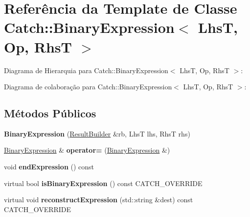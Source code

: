 \hypertarget{classCatch_1_1BinaryExpression}{}\section{Referência da Template de Classe Catch\+:\+:Binary\+Expression$<$ LhsT, Op, RhsT $>$}
\label{classCatch_1_1BinaryExpression}


Diagrama de Hierarquia para Catch\+:\+:Binary\+Expression$<$ LhsT, Op, RhsT $>$\+:


Diagrama de colaboração para Catch\+:\+:Binary\+Expression$<$ LhsT, Op, RhsT $>$\+:
\subsection*{Métodos Públicos}
\begin{DoxyCompactItemize}
\item 
{\bfseries Binary\+Expression} (\hyperlink{classCatch_1_1ResultBuilder}{Result\+Builder} \&rb, LhsT lhs, RhsT rhs)\hypertarget{classCatch_1_1BinaryExpression_a0d81384761aba5f7a6d5f4fc7e7944f3}{}\label{classCatch_1_1BinaryExpression_a0d81384761aba5f7a6d5f4fc7e7944f3}

\item 
\hyperlink{classCatch_1_1BinaryExpression}{Binary\+Expression} \& {\bfseries operator=} (\hyperlink{classCatch_1_1BinaryExpression}{Binary\+Expression} \&)\hypertarget{classCatch_1_1BinaryExpression_a2147a858eb5866e5643d0ef321064aa1}{}\label{classCatch_1_1BinaryExpression_a2147a858eb5866e5643d0ef321064aa1}

\item 
void {\bfseries end\+Expression} () const \hypertarget{classCatch_1_1BinaryExpression_a480b1d75bbac51d1936aec7dad8c1cb1}{}\label{classCatch_1_1BinaryExpression_a480b1d75bbac51d1936aec7dad8c1cb1}

\item 
virtual bool {\bfseries is\+Binary\+Expression} () const C\+A\+T\+C\+H\+\_\+\+O\+V\+E\+R\+R\+I\+DE\hypertarget{classCatch_1_1BinaryExpression_a4c617c0b6a73a9cafbbf900909c7c258}{}\label{classCatch_1_1BinaryExpression_a4c617c0b6a73a9cafbbf900909c7c258}

\item 
virtual void {\bfseries reconstruct\+Expression} (std\+::string \&dest) const C\+A\+T\+C\+H\+\_\+\+O\+V\+E\+R\+R\+I\+DE\hypertarget{classCatch_1_1BinaryExpression_a6ed73ff9af9c229f9fa3d35d019f9e37}{}\label{classCatch_1_1BinaryExpression_a6ed73ff9af9c229f9fa3d35d019f9e37}

\end{DoxyCompactItemize}


